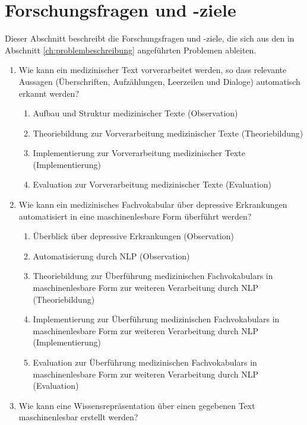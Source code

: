 
\chapter{Forschungsfragen und -ziele}

Dieser Abschnitt beschreibt die Forschungsfragen und -ziele, die sich aus den in Abschnitt \ref{ch:problembeschreibung} angeführten Problemen ableiten.


\begin{enumerate}[label=FZ \arabic*]
\item Wie kann ein medizinischer Text vorverarbeitet werden, so dass relevante Aussagen (Überschriften, Aufzählungen, Leerzeilen und Dialoge) automatisch erkannt werden?

\begin{enumerate}[label=\theenumi.\arabic*]
\item Aufbau und Struktur medizinischer Texte (Observation)
\item Theoriebildung zur Vorverarbeitung medizinischer Texte (Theoriebildung)
\item Implementierung zur Vorverarbeitung medizinischer Texte (Implementierung)
\item Evaluation zur Vorverarbeitung medizinischer Texte (Evaluation)
\end{enumerate}

\item Wie kann ein medizinisches Fachvokabular über depressive Erkrankungen automatisiert in eine maschinenlesbare Form überführt werden?

\begin{enumerate}[label=\theenumi.\arabic*]
\item Überblick über depressive Erkrankungen (Observation)
\item Automatisierung durch NLP (Observation)
\item Theoriebildung zur Überführung medizinischen Fachvokabulars in maschinenlesbare Form zur weiteren Verarbeitung durch NLP (Theoriebildung)
\item Implementierung zur Überführung medizinischen Fachvokabulars in maschinenlesbare Form zur weiteren Verarbeitung durch NLP (Implementierung)
\item Evaluation zur Überführung medizinischen Fachvokabulars in maschinenlesbare Form zur weiteren Verarbeitung durch NLP (Evaluation)

\end{enumerate}

\item Wie kann eine Wissensrepräsentation über einen gegebenen Text maschinenlesbar erstellt werden?


\end{enumerate}
